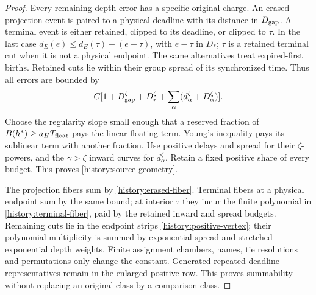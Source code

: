 \begin{proof}
Every remaining depth error has a specific original charge. An erased
projection event is paired to a physical deadline with its distance in
$D_{\rm gap}$. A terminal event is either retained, clipped to its
deadline, or clipped to $\tau$. In the last case
$d_E(e)\le d_E(\tau)+(e-\tau)$, with $e-\tau$ in $D_*$;
$\tau$ is a retained terminal cut when it is not a physical endpoint.
The same alternatives treat expired-first births. Retained cuts lie
within their group spread of its synchronized time. Thus all errors
are bounded by
\begin{equation}
 C[1+D_{\rm gap}^\zeta+D_*^\zeta+
                    \sum_\alpha(d_\alpha^\zeta+D_\alpha^\zeta)].
 \label{history:all-depth-errors}
\end{equation}
Choose the regularity slope small enough that a reserved fraction of
$B(h^*)\ge a_HT_{\rm float}$ pays the linear floating term.
Young's inequality pays its sublinear term with another fraction.
Use positive delays and spread for their $\zeta$-powers, and the
$\gamma>\zeta$ inward curves for $d_\alpha^\zeta$. Retain a fixed
positive share of every budget. This proves
\eqref{history:source-geometry}.

The projection fibers sum by \eqref{history:erased-fiber}. Terminal
fibers at a physical endpoint sum by the same bound; at interior
$\tau$ they incur the finite polynomial in
\eqref{history:terminal-fiber}, paid by the retained inward and
spread budgets. Remaining cuts lie in the endpoint strips
\eqref{history:positive-vertex}; their polynomial multiplicity is
summed by exponential spread and stretched-exponential depth weights.
Finite assignment chambers, names, tie resolutions and permutations
only change the constant. Generated repeated deadline representatives
remain in the enlarged positive row. This proves summability without
replacing an original class by a comparison class.
\end{proof}


